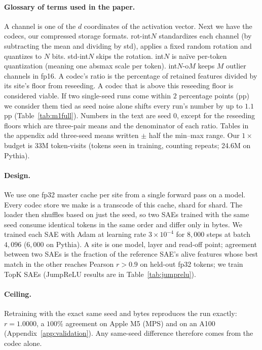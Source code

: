 \documentclass{article}
\begin{document}
\paragraph{Glossary of terms used in the paper.} A channel is one of
the $d$ coordinates of the activation vector. Next we have the codecs,
our compressed storage formats. rot-int$N$ standardizes each channel
(by subtracting the mean and dividing by std), applies a fixed random
rotation and quantizes to $N$ bits. std-int$N$ skips the rotation.
int$N$ is na\"ive per-token quantization (meaning one absmax scale per
token). int$N$-o$M$ keeps $M$ outlier channels in fp16. A codec's
ratio is the percentage of retained features divided by its site's
floor from reseeding. A codec that is above this reseeding floor is
considered viable. If two single-seed runs come within $2$ percentage
points (pp) we consider them tied as seed noise alone shifts every
run's number by up to $1.1$\,pp (Table~\ref{tab:m1full}). Numbers in
the text are seed 0, except for the reseeding floors which are
three-pair means and the denominator of each ratio. Tables in the
appendix add three-seed means written $\pm$ half the min--max range.
Our $1\times$ budget is 33M token-visits (tokens seen in training,
counting repeats; 24.6M on Pythia).

\paragraph{Design.} We use one fp32 master cache per site from a single
forward pass on a model. Every codec
store we make is a transcode of this cache, shard for shard. The loader then shuffles based on just the
seed, so two SAEs trained with the same seed consume identical tokens
in the same order and differ only in bytes. We trained each SAE with
Adam at learning rate $3\times10^{-4}$ for $8{,}000$ steps at batch
$4{,}096$ ($6{,}000$ on Pythia).
A site is one model, layer and read-off point; agreement
between two SAEs is the fraction of the reference SAE's alive features whose best match in the other reaches Pearson $r > 0.9$
on held-out fp32 tokens; we train
TopK SAEs (JumpReLU results are in Table~\ref{tab:jumprelu}).

\paragraph{Ceiling.} Retraining with the exact same seed and bytes
reproduces the run exactly: $r = 1.0000$, a $100\%$ agreement on Apple
M5 (MPS) and on an A100 (Appendix~\ref{app:validation}). Any same-seed
difference therefore comes from the codec alone.
\end{document}
